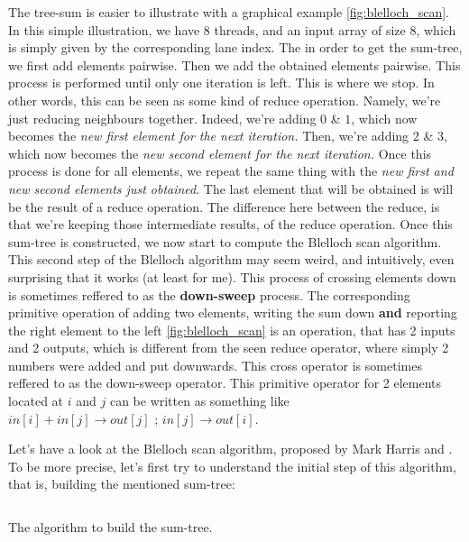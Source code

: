 The tree-sum is easier to illustrate with a graphical example \autoref{fig:blelloch_scan}. In this simple illustration, 
we have 8 threads, and an input array of size 8, which is simply given by the corresponding lane index.
The in order to get the sum-tree, we first add elements pairwise. Then we add the obtained elements pairwise. 
This process is performed until only one iteration is left. This is where we stop. In other words, this 
can be seen as some kind of reduce operation. Namely, we're just reducing neighbours together. Indeed, 
we're adding $0$ \& $1$, which now becomes the \textit{new first element for the next iteration.} Then, 
we're adding $2$ \& $3$, which now becomes the \textit{new second element for the next iteration.} Once 
this process is done for all elements, we repeat the same thing with the \textit{new first and new second elements just obtained}.
The last element that will be obtained is will be the result of a reduce operation. The difference here between the reduce, is that 
we're keeping those intermediate results, of the reduce operation.
Once this sum-tree is constructed, we now start to compute the Blelloch scan algorithm. This second step of 
the Blelloch algorithm may seem weird, and intuitively, even surprising that it works (at least for me). 
This process of crossing elements down is sometimes reffered to as the \textbf{down-sweep} process. The corresponding 
primitive operation of adding two elements, writing the sum down \textbf{and} reporting the right element to the left \autoref{fig:blelloch_scan} is 
an operation, that has 2 inputs and 2 outputs, which is different from the seen reduce operator, where simply 2 numbers were added and put downwards.
This cross operator is sometimes reffered to as the down-sweep operator. This primitive operator for 2 elements located at $i$ and $j$ 
can be written as something like $in[i] + in[j] \xrightarrow{} out[j]\text{ ; } in[j] \xrightarrow{} out[i]$. 


Let's have a look at the Blelloch scan algorithm, proposed by Mark Harris \cite{harris_parallel_2007} and
\cite{boreskov__nodate}. To be more precise, let's first try to understand the initial step of this algorithm, 
that is, building the mentioned sum-tree:

\begin{listing}[ht!]
\inputminted[frame=single, framesep=1mm, linenos=true]{cuda}{cucodes/blelloch_kernel.cu}
\caption{The algorithm to build the sum-tree.}
\end{listing}

